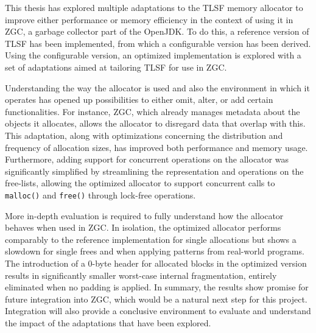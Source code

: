 
This thesis has explored multiple adaptations to the TLSF memory allocator to improve either performance or memory efficiency in the context of using it in ZGC, a garbage collector part of the OpenJDK. To do this, a reference version of TLSF has been implemented, from which a configurable version has been derived. Using the configurable version, an optimized implementation is explored with a set of adaptations aimed at tailoring TLSF for use in ZGC.

Understanding the way the allocator is used and also the environment in which it operates has opened up possibilities to either omit, alter, or add certain functionalities. For instance, ZGC, which already manages metadata about the objects it allocates, allows the allocator to disregard data that overlap with this. This adaptation, along with optimizations concerning the distribution and frequency of allocation sizes, has improved both performance and memory usage. Furthermore, adding support for concurrent operations on the allocator was significantly simplified by streamlining the representation and operations on the free-lists, allowing the optimized allocator to support concurrent calls to \texttt{malloc()} and \texttt{free()} through lock-free operations.

More in-depth evaluation is required to fully understand how the allocator behaves when used in ZGC. In isolation, the optimized allocator performs comparably to the reference implementation for single allocations but shows a slowdown for single frees and when applying patterns from real-world programs. The introduction of a 0-byte header for allocated blocks in the optimized version results in significantly smaller worst-case internal fragmentation, entirely eliminated when no padding is applied. In summary, the results show promise for future integration into ZGC, which would be a natural next step for this project. Integration will also provide a conclusive environment to evaluate and understand the impact of the adaptations that have been explored.

